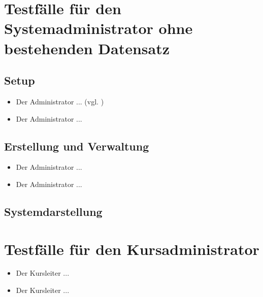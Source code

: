 \documentclass[a4paper]{scrreprt}
\newcounter{Lc}
\newcounter{Hc}
\newcommand{\stepHc}{\stepcounter{Hc}\setcounter{Lc}{0}}
\begin{document}
	\section{Testfälle für den Systemadministrator ohne bestehenden Datensatz}
		\subsection{Setup}
			\begin{itemize}
				\item {} 
				Der Administrator ... (vgl. )		
				\item {} 
				Der Administrator ... 		
			\end{itemize}			
		\subsection{Erstellung und Verwaltung}
			\begin{itemize}
				\item {} 
				Der Administrator ... 		
				\item {} 
				Der Administrator ... 		
			\end{itemize}						
		\subsection{Systemdarstellung}
			
			
			
	\section{Testfälle für den Kursadministrator}
		\stepHc
		\begin{itemize}
			\item {} 
			Der Kursleiter ... 		
			\item {} 
			Der Kursleiter ... 		
		\end{itemize}	
		
			
\end{document}
